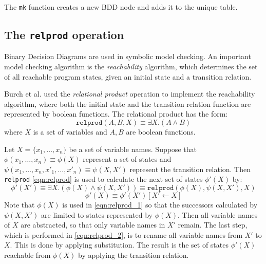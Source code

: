 The \texttt{mk} function creates a new BDD node and adds it to the unique table.

\subsection{The \texttt{relprod} operation}
Binary Decision Diagrams are used in symbolic model checking. An important model checking algorithm is the \emph{reachability} algorithm, which determines the set of all reachable program states, given an initial state and a transition relation. 

Burch et al. \cite{burch1994symbolic} used the \emph{relational product} operation to implement the reachability algorithm, where both the initial state and the transition relation function are represented by boolean functions. The relational product has the form: 
\begin{equation}
	\texttt{relprod}(A, B, X) \equiv \exists X. (A \wedge B)
	\label{eqn:relprod}
\end{equation}
where $X$ is a set of variables and $A, B$ are boolean functions.

Let $X = \{ x_1, \dots, x_n \}$ be a set of variable names. Suppose that $\phi(x_1, \dots, x_n) \equiv \phi(X)$ represent a set of states and $\psi(x_1, \dots, x_n, x'_1, \dots, x'_n) \equiv \psi(X, X')$ represent the transition relation. Then \texttt{relprod} \ref{eqn:relprod} is used to calculate the next set of states $\phi'(X)$ by:
\begin{equation}
	\phi'(X') \equiv \exists X. (\phi(X) \wedge \psi(X, X')) \equiv \texttt{relprod}(\phi(X), \psi(X, X'), X)
	\label{eqn:relprod_1}
\end{equation}
\begin{equation}
	\phi'(X) \equiv \phi'(X')[X' \gets X]
	\label{eqn:relprod_2}
\end{equation}
Note that $\phi(X)$ is used in \ref{eqn:relprod_1} so that the successors calculated by $\psi(X, X')$ are limited to states represented by $\phi(X)$. Then all variable names of $X$ are abstracted, so that only variable names in $X'$ remain. The last step, which is performed in \ref{eqn:relprod_2}, is to rename all variable names from $X'$ to $X$. This is done by applying substitution. The result is the set of states $\phi'(X)$ reachable from $\phi(X)$ by applying the transition relation.

